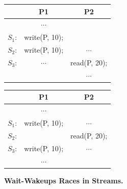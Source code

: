 \begin{figure}[t]
  \begin{minipage}{\linewidth}
    \centering
    \begin{minipage}{.42\linewidth}
      \begin{rbox}
        \centering
        \begin{tabular}{ccc}
                  & {\bf P1}      & {\bf P2}     \\ \hline
                  & $\cdots$      &              \\
          $S_1$:  & write(P, 10); &              \\
          $S_2$:  & write(P, 10); & $\cdots$     \\
          $S_3$:  & $\cdots$      & read(P, 20); \\
                  &               & $\cdots$     \\
        \end{tabular}
      \end{rbox}
      \vspace{-2.2em}
    \end{minipage}
    \hspace{3em}
    \begin{minipage}{.42\linewidth}
      \begin{rbox}
        \centering
        \begin{tabular}{ccc}
                   & {\bf P1}      & {\bf P2}     \\ \hline
                   & $\cdots$      &              \\
          $S_1$:   & write(P, 10); & $\cdots$     \\
          $S_2$:   &               & read(P, 20); \\
          $S_3$:   & write(P, 10); & $\cdots$     \\
                   & $\cdots$      &              \\
        \end{tabular}
      \end{rbox}
      \vspace{-2.2em}
    \end{minipage}
  \end{minipage}
  \caption{{\bf Wait-Wakeups Races in Streams.}}
  \label{racepro:fig:streams}
\end{figure}

